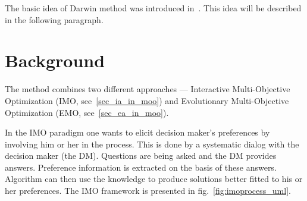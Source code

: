 The basic idea of Darwin method was introduced in~\cite{GMS09}. This idea will
be described in the following paragraph.

\section{Background}

The method combines two different approaches --- Interactive Multi-Objective
Optimization (IMO, see~\ref{sec_ia_in_moo}) and Evolutionary Multi-Objective
Optimization (EMO, see~\ref{sec_ea_in_moo}).

In the IMO paradigm one wants to elicit decision maker's preferences by
involving him or her in the process. This is done by a systematic dialog with
the decision maker (the DM). Questions are being asked and the DM provides
answers. Preference information is extracted on the basis of these
answers. Algorithm can then use the knowledge to produce solutions better
fitted to his or her preferences. The IMO framework is presented in
fig.~\ref{fig:imoprocess_uml}.


        




